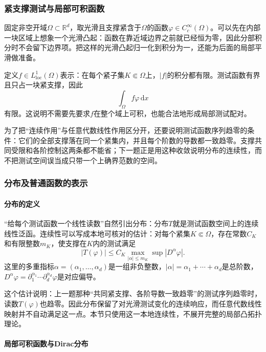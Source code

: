 \subsubsection{紧支撑测试与局部可积函数}
\label{subsubsec:test-functions-local-integrable}

固定非空开域$\Omega\subset\mathbb R^d$，取光滑且支撑紧含于$\Omega$的函数$\varphi\in C_c^\infty(\Omega)$。可以先在内部一块区域上想象一个光滑凸起：函数在靠近域边界之前就已经恒为零，因此分部积分时不会留下边界项。把这样的光滑凸起归一化到积分为一，还能为后面的局部平滑做准备。

定义$f\in L^1_{\mathrm{loc}}(\Omega)$表示：在每个紧子集$K\Subset\Omega$上，$|f|$的积分都有限。测试函数有界且只占一块紧支撑，因此
\[
  \int_\Omega f\varphi\,\mathrm dx
\]
有限。这说明不需要先要求$f$在整个域上可积，也能合法地形成局部测试配对。

为了把“连续作用”与任意代数线性作用区分开，还要说明测试函数序列趋零的条件：它们的全部支撑落在同一个紧集内，并且每个阶数的导数都一致趋零。支撑共同受限和各阶控制这两条都不能省；下一题正是用这种收敛说明分布的连续性，而不把测试空间误当成只带一个上确界范数的空间。

\subsubsection{分布及普通函数的表示}
\label{subsubsec:distributions-regular}

\paragraph{分布的定义}

“给每个测试函数一个线性读数”自然引出分布：分布$T$就是测试函数空间上的连续线性泛函。连续性可以写成本地可核对的估计：对每个紧集$K\Subset\Omega$，存在常数$C_K$和有限整数$m_K$，使支撑在$K$内的测试满足
\[
  |T(\varphi)|\le C_K\max_{|\alpha|\le m_K}\sup|D^\alpha\varphi|.
\]
这里的多重指标$\alpha=(\alpha_1,\ldots,\alpha_d)$是一组非负整数，$|\alpha|=\alpha_1+\cdots+\alpha_d$是总阶数，$D^\alpha\varphi=\partial_1^{\alpha_1}\cdots\partial_d^{\alpha_d}\varphi$是对应偏导。

这个估计说明：上一题那种“共同紧支撑、各阶导数一致趋零”的测试序列趋零时，读数$T(\varphi)$也趋零。因此分布保留了对光滑测试变化的连续响应，而任意代数线性映射并不自动满足这一点。本节只使用这一本地连续性，不展开完整的局部凸拓扑理论。

\paragraph{局部可积函数与Dirac分布}

